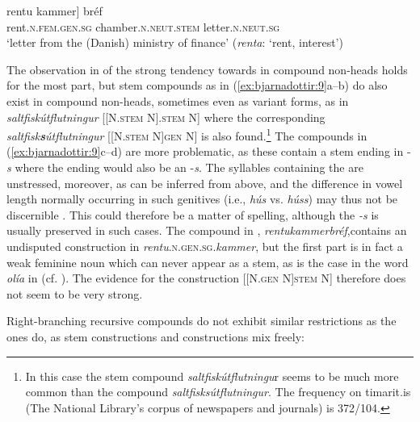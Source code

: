 \documentclass[output=paper]{LSP/langsci}
\begin{document}
\ex \label{ex:bjarnadottir:9e}
\gll {\ob}rentu kammer] bréf\\
   rent\textsc{.n.fem.gen.sg} chamber\textsc{.n.neut.stem} letter\textsc{.n.neut.sg}\\
\glt ‘letter from the (Danish) ministry of finance’ (\textit{renta}: ‘rent, interest’)
\z
\z

The observation in \citealt{Jónsson1984} of the strong tendency towards  in compound non-heads holds for the most part, but stem compounds as in (\ref{ex:bjarnadottir:9}a–b) do also exist in compound non-heads, sometimes even as variant forms, as in  \textit{saltfiskútflutningur} [[N\textsc{.stem} N]\textsc{.stem} N] where the corresponding \textit{saltfisk}\textbf{\textit{s}}\textit{útflutn\-ing\-ur} [[N\textsc{.stem} N]\textsc{gen} N] is also found.\footnote{In this case the stem compound \textit{saltfiskútflutningu}r seems to be much more common than the  compound \textit{saltfisksútflutningur}. The frequency on timarit.is (The National Library’s corpus of newspapers and journals) is 372\slash 104.} The compounds in (\ref{ex:bjarnadottir:9}c–d) are more problematic, as these contain a stem ending in -\textit{s} where the  ending would also be an -\textit{s}. The syllables containing the  are unstressed, moreover, as can be inferred from  above, and the difference in vowel length normally occurring in such genitives (i.e., \textit{hús} vs. \textit{húss}) may thus not be discernible \citep{Árnason2011}. This could therefore be a matter of spelling, although the  \textit{-s} is usually preserved in such cases. The compound in , \textit{rentukammerbréf},\largerpage contains an undisputed  construction in \textit{rentu}\textsc{.n.gen.sg.}\textit{kammer}, but the first part is in fact a weak feminine noun which can never appear as a stem, as is the case in the word \textit{olía} in  (cf. ). The evidence for the construction [[N\textsc{.gen} N]\textsc{stem} N] therefore does not seem to be very strong.

Right-branching recursive compounds do not exhibit similar restrictions as the  ones do, as stem constructions and  constructions mix freely:
\end{document}
